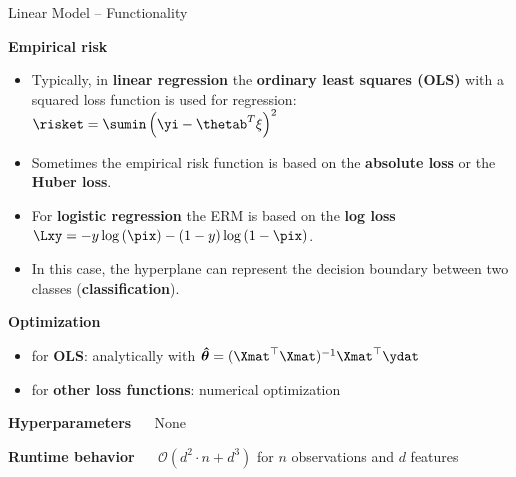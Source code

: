 \documentclass[11pt,compress,t,notes=noshow, xcolor=table]{beamer}
\newcommand{\highlight}[1]{\textcolor{highlightcol}{\textbf{#1}}}
\begin{document}
\begin{frame}{Linear Model -- Functionality}

\footnotesize

\highlight{Empirical risk}
\begin{itemize}\footnotesize
  \item Typically, in \textbf{linear regression} the \textbf{ordinary least squares (OLS)} with a squared loss function is used for regression: $\risket  = \sumin \left(\yi - \thetab^T \xi\right)^2$
    
   \item Sometimes the empirical risk function is based on the \textbf{absolute loss} or the \textbf{Huber loss}. %
  
  \item For \textbf{logistic regression} the ERM is based on the \textbf{log loss} $\Lxy = -y \log \left(\pix\right) - (1 - y) \log \left(1 - \pix\right)$.
  
  \item In this case, the hyperplane can represent the decision boundary between two classes (\textbf{classification}). 


\end{itemize}

\footnotesize

\medskip

\highlight{Optimization}
\begin{itemize}\footnotesize
  \item for \textbf{OLS}: analytically with $\bm{\hat \theta} = (\Xmat^\top \Xmat)^{-1} \Xmat^\top\ydat$
  \item for \textbf{other loss functions}: numerical optimization 
\end{itemize}

\medskip

\highlight{Hyperparameters} ~~ None

\medskip

\highlight{Runtime behavior} ~~ $\mathcal{O}(d^2 \cdot n + d^3)$ for $n$ 
observations and $d$ features

\end{frame}

\end{document}
